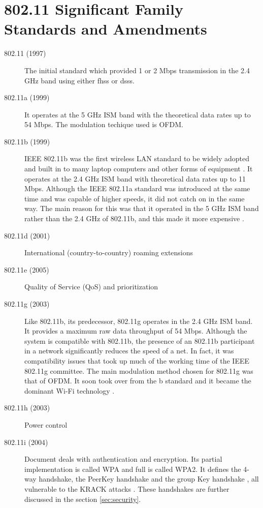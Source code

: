 \chapter{802.11 Significant Family Standards and Amendments}
\label{app:802.11}

\begin{description}
\item [802.11 (1997)] The initial standard which provided 1 or 2 Mbps transmission in the 2.4 GHz band using either \gls{fhss} or \gls{dsss}. %

\item [802.11a (1999)] It operates at the 5 GHz ISM band with the theoretical data rates up to 54 Mbps. The modulation techique used is OFDM. %

\item [802.11b (1999)] IEEE 802.11b was the first wireless LAN standard to be widely adopted and built in to many laptop computers and other forms of equipment \cite{PHY13}. It operates at the 2.4 GHz ISM band with theoretical data rates up to 11 Mbps. Although the IEEE 802.11a standard was introduced at the same time and was capable of higher speeds, it did not catch on in the same way. The main reason for this was that it operated in the 5 GHz ISM band rather than the 2.4 GHz of 802.11b, and this made it more expensive \cite{PHY13}. %

\item [802.11d (2001)] International (country-to-country) roaming extensions

\item [802.11e (2005)] Quality of Service (QoS) and prioritization

\item [802.11g (2003)] Like 802.11b, its predecessor, 802.11g operates in the 2.4 GHz ISM band. It provides a maximum raw data throughput of 54 Mbps. Although the system is compatible with 802.11b, the presence of an 802.11b participant in a network significantly reduces the speed of a net. In fact, it was compatibility issues that took up much of the working time of the IEEE 802.11g committee. The main modulation method chosen for 802.11g was that of OFDM. It soon took over from the b standard and it became the dominant Wi-Fi technology \cite{RE18}. 

\item [802.11h (2003)] Power control

\item [802.11i (2004)] Document deals with authentication and encryption. Its partial implementation is called WPA and full is called WPA2. It defines the 4-way handshake, the PeerKey handshake and the group Key handshake \cite{ieee802.11i_2004}, all vulnerable to the KRACK attacks \cite{VA17}. These handshakes are further discussed in the section \ref{sec:security}.


\end{description}
